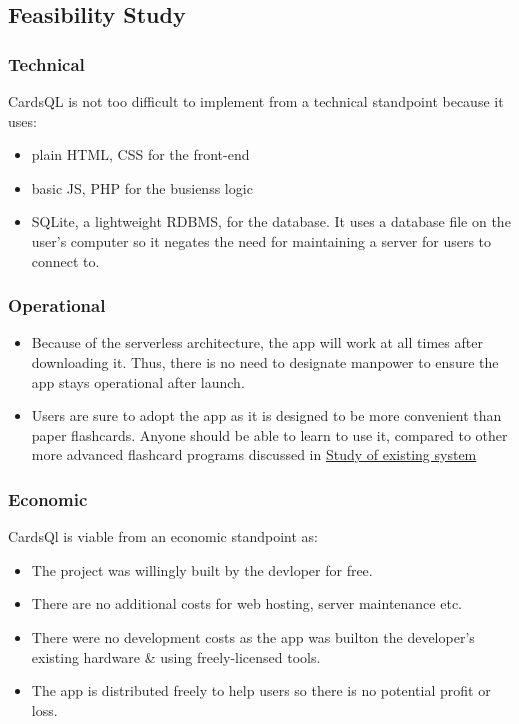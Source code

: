 \documentclass[a4paper]{article}
\begin{document}
\subsection{Feasibility Study}
\label{sec:orgfac5c11}
\subsubsection{Technical}
\label{sec:org923e076}
CardsQL is not too difficult to implement from a technical standpoint because it uses:

\begin{itemize}
\item plain HTML, CSS for the front-end
\item basic JS, PHP for the busienss logic
\item SQLite, a lightweight RDBMS, for the database. It uses a database file on the user's computer so it negates the need for maintaining a server for users to connect to.
\end{itemize}
\subsubsection{Operational}
\label{sec:org958e0ee}
\begin{itemize}
\item Because of the serverless architecture, the app will work at all times after downloading it. Thus, there is no need to designate manpower to ensure the app stays operational after launch.
\item Users are sure to adopt the app as it is designed to be more convenient than paper flashcards. Anyone should be able to learn to use it, compared to other more advanced flashcard programs discussed in \hyperref[sec:orgeb062fa]{Study of existing system}
\end{itemize}
\subsubsection{Economic}
\label{sec:org89412b2}
CardsQl is viable from an economic standpoint as:

\begin{itemize}
\item The project was willingly built by the devloper for free.
\item There are no additional costs for web hosting, server maintenance etc.
\item There were no development costs as the app was builton the developer's existing hardware \& using freely-licensed tools.
\item The app is distributed freely to help users so there is no potential profit or loss.
\end{itemize}
\clearpage 
\end{document}
